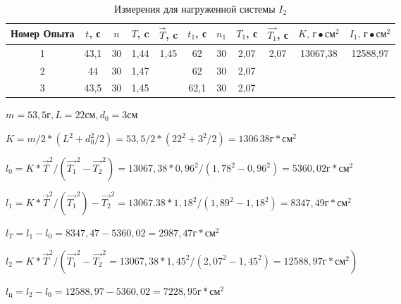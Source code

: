 \begin{table}[ht]
    \centering
    
    \begin{tabular}{|c|c|c|c|c|c|c|c|c|c|c|}
        \hline
        Номер Опыта & $t$, с & $n$ & $T$, c &     $\vec{T}$, c      & $t_1$, с & $n_1$ & $T_1$, с & $\vec{T_1}$, с         & $K \text{, г}\bullet\text{см}^2$ & $I_1\text{, г}\bullet\text{см}^2$ \\
        \hline
                  1 &  43,1  & 30  &  1,44  & \multirow{3}{*}{1,45} &   62     &  30   &  2,07     & \multirow{3}{*}{2,07}  &     \multirow{3}{*}{13067,38 }   & \multirow{3}{*}{12588,97}          \\
        \hline
                  2 &  44    & 30  &  1,47  &                       &   62     &  30   &  2,07     &                        &                                  &                                   \\
        \hline
                  3 &  43,5  & 30  &  1,45  &                       &   62,1   &  30   &  2,07     &                        &                                  &                                   \\
        \hline
    \end{tabular}

    \caption{Измерения для нагруженной системы $I_2$} \label{table-3}
\end{table}

%

$m = 53,5 \text{г}, L = 22 \text{см}, d_0 = 3 \text{см}$

$K = m / 2 \ast (L^2 + d_0^2 / 2) = 
53,5 / 2 \ast (22^2 + 3^2 / 2) = 1306\,38 \text{г} \ast \text{см}^2$

$l_0 = K \ast \vec{T}^2 / (\vec{T_1}^2 - \vec{T_2}^2) =
13067,38 \ast 0,96^2 / (1,78^2 - 0,96^2) = 5360,02 \text{г} \ast \text{см}^2$

$l_1 = K \ast \vec{T}^2 / (\vec{T_1}^2) - \vec{T_2}^2 =
13067.38 \ast 1,18^2 / (1,89^2 - 1,18 ^2) =8347,49 \text{г} \ast \text{см}^2$

$l_T = l_1 - l_0 = 8347,47 - 5360,02 = 2987,47 \text{г} \ast \text{см}^2$

$l_2 = K \ast \vec{T}^2 / (\vec{T_1}^2 - \vec{T_2}^2 =
13067,38 \ast 1,45^2 / (2,07^2 - 1,45 ^2) = 12588,97 \text{г} \ast \text{см}^2)$

$l_{\text{ц}} = l_2 - l_0 = 12588,97 - 5360,02 = 7228,95 \text{г} \ast \text{см}^2$

